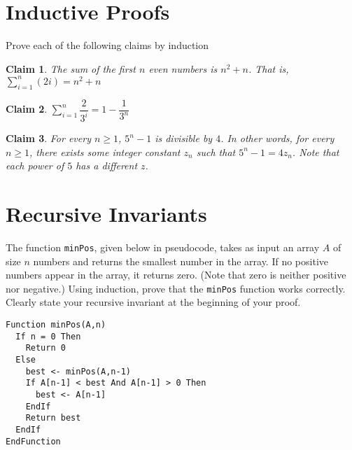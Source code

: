 \documentclass{article}
\newtheorem{claim}{Claim}
\begin{document}
    \section{Inductive Proofs}

    Prove each of the following claims by induction

    \begin{claim}
      The sum of the first $n$ even numbers is $n^2+n$.  That is, $\sum\limits_{i=1}^n (2i) = n^2+n$
    \end{claim}



    \begin{claim}
      $\sum\limits_{i=1}^{n} \dfrac{2}{3^i} = 1 - \dfrac{1}{3^n}$
    \end{claim}



    \begin{claim}
      For every $n \geq 1$, $5^n - 1$ is divisible by $4$.  In other words, for every $n \geq 1$, there exists some integer constant $z_n$ such that $5^n - 1 = 4z_n$.  Note that each power of $5$ has a different $z$.
    \end{claim}



    \vspace{1cm}
    \section{Recursive Invariants}

    The function \texttt{minPos}, given below in pseudocode, takes as input an array $A$ of size $n$ numbers and returns the smallest  number in the array.  If no positive numbers appear in the array, it returns zero.  (Note that zero is neither positive nor negative.)  Using induction, prove that the \texttt{minPos} function works correctly.  Clearly state your recursive invariant at the beginning of your proof.

    \begin{verbatim}
Function minPos(A,n)
  If n = 0 Then
    Return 0
  Else
    best <- minPos(A,n-1)
    If A[n-1] < best And A[n-1] > 0 Then
      best <- A[n-1]
    EndIf
    Return best
  EndIf
EndFunction
    \end{verbatim}

\end{document}
